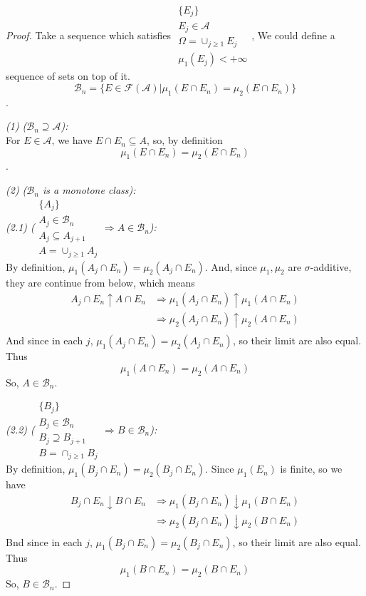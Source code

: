 \begin{proof}
  Take a sequence which satisfies $\substack{\{E_j\}\\E_j\in\mathcal{A}\\ \Omega = \cup_{j\geq 1} E_j \\ \mu_1(E_j) < +\infty}$,
  We could define a sequence of sets on top of it.
  \[\mathcal{B}_n = \{E\in\mathcal{F}(\mathcal{A}) | \mu_1(E\cap E_n) = \mu_2(E\cap E_n)\}\].

  \emph{(1) ($\mathcal{B}_n \supseteq \mathcal{A}$):} \\
  For $E\in\mathcal{A}$, we have $E\cap E_n\subseteq A$,
  so, by definition \[\mu_1(E\cap E_n) = \mu_2(E\cap E_n)\].

  \emph{(2) ($\mathcal{B}_n$ is a monotone class):} \\
  \emph{(2.1) ($\substack{\{A_j\}\\A_j\in \mathcal{B}_n\\A_j\subseteq A_{j+1} \\ A = \cup_{j\geq 1} A_j} \Rightarrow A \in \mathcal{B}_n $):}\\
  By definition, $\mu_1(A_j\cap E_n) = \mu_2(A_j\cap E_n)$.
  And, since $\mu_1, \mu_2$ are $\sigma$-additive, they are continue from below, which means
  \begin{align*}
    A_j\cap E_n \uparrow A\cap E_n &\Rightarrow \mu_1(A_j\cap E_n) \uparrow \mu_1(A\cap E_n) \\
                                   &\Rightarrow \mu_2(A_j\cap E_n) \uparrow \mu_2(A\cap E_n) \\
  \end{align*}
  And since in each $j$, $\mu_1(A_j\cap E_n) = \mu_2(A_j\cap E_n)$, so their limit are also equal.
  Thus
  \[\mu_1(A\cap E_n) = \mu_2(A\cap E_n)\]
  So, $A\in \mathcal{B}_n$.
  
  \emph{(2.2) ($\substack{\{B_j\}\\B_j\in \mathcal{B}_n\\B_j\supseteq B_{j+1}\\ B = \cap_{j\geq 1} B_j} \Rightarrow B\in \mathcal{B}_n$):}\\
  By definition, $\mu_1(B_j\cap E_n) = \mu_2(B_j\cap E_n)$.
  Since $\mu_1(E_n)$ is finite, so we have
  \begin{align*}
    B_j\cap E_n \downarrow B\cap E_n &\Rightarrow \mu_1(B_j\cap E_n) \downarrow \mu_1(B\cap E_n) \\
                                   &\Rightarrow \mu_2(B_j\cap E_n) \downarrow \mu_2(B\cap E_n) \\
  \end{align*}
  Bnd since in each $j$, $\mu_1(B_j\cap E_n) = \mu_2(B_j\cap E_n)$, so their limit are also equal.
  Thus
  \[\mu_1(B\cap E_n) = \mu_2(B\cap E_n)\]
  So, $B\in \mathcal{B}_n$.
  

\end{proof}
